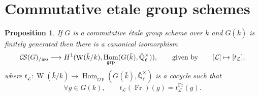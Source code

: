 \documentclass[11pt]{amsart}
\theoremstyle{plain}
\newtheorem{proposition}[theorem]{Proposition}
\theoremstyle{definition}
\theoremstyle{remark}
\newcommand{\EE}{\mathbb{\bar Q}_\ell}
\newcommand{\bFq}{\bar{k}}
\newcommand{\Fq}{k}
\DeclareMathOperator{\Weil}{W}
\newcommand{\Frob}{{\operatorname{Fr}}}
\DeclareMathOperator{\Hom}{Hom}
\newcommand{\cs}[1]{{\mathcal{#1}}}
\newcommand{\CS}{{\mathcal{C\hskip-1.8pt S}}}
\begin{document}
\section{Commutative etale group schemes}

%

\begin{proposition}\label{prop:etale}
  If $G$ is a commutative \'etale group scheme over $\Fq$ and
  $G(\bFq)$ is finitely generated then there is a canonical
  isomorphism
  \[
  \CS(G)_{/\text{iso}} \longrightarrow H^1(\Weil(\bFq/\Fq), \Hom_\text{grp}(G(\bFq),\EE^\times)),
  \qquad \text{given by}\qquad
  [\cs{L}] \mapsto [t_\cs{L}],
  \]
  where $t_\cs{L}: \Weil(\bFq/\Fq)\to \Hom_\text{grp}(G(\bFq),\EE^\times)$ is a cocycle such that
  \[
  \forall g\in G(\Fq), \qquad t_\cs{L}(\Frob)(g) = t^\Frob_\cs{L}(g).
  \]
\end{proposition}
\end{document}
